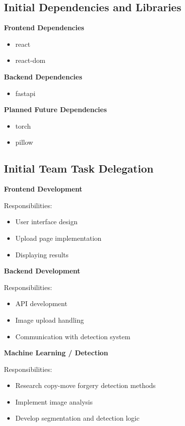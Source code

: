 \documentclass[12pt]{article}
\begin{document}
\subsection{Initial Dependencies and Libraries}

\textbf{Frontend Dependencies}

\begin{itemize}
    \item react
    \item react-dom
\end{itemize}

\textbf{Backend Dependencies}

\begin{itemize}
    \item fastapi
\end{itemize}

\textbf{Planned Future Dependencies}

\begin{itemize}
    \item torch
    \item pillow
\end{itemize}

\subsection{Initial Team Task Delegation}

\textbf{Frontend Development}

Responsibilities:

\begin{itemize}
    \item User interface design
    \item Upload page implementation
    \item Displaying results
\end{itemize}

\textbf{Backend Development}

Responsibilities:

\begin{itemize}
    \item API development
    \item Image upload handling
    \item Communication with detection system
\end{itemize}

\textbf{Machine Learning / Detection}

Responsibilities:

\begin{itemize}
    \item Research copy-move forgery detection methods
    \item Implement image analysis
    \item Develop segmentation and detection logic
\end{itemize}
\end{document}
